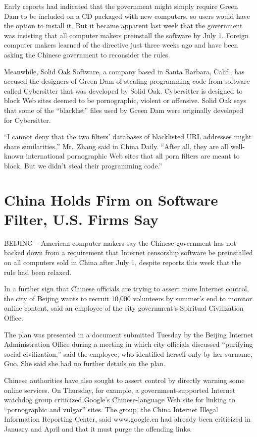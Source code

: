 ﻿\documentclass[12pt,a4paper,onecolumn]{article}
\begin{document}
Early reports had indicated that the government might simply require Green Dam to be included on a
CD packaged with new computers, so users would have the option to install it. But it became apparent
last week that the government was insisting that all computer makers preinstall the software by July
1. Foreign computer makers learned of the directive just three weeks ago and have been asking the
Chinese government to reconsider the rules.

Meanwhile, Solid Oak Software, a company based in Santa Barbara, Calif., has accused the designers
of Green Dam of stealing programming code from software called Cybersitter that was developed by
Solid Oak. Cybersitter is designed to block Web sites deemed to be pornographic, violent or
offensive. Solid Oak says that some of the ``blacklist'' files used by Green Dam were originally
developed for Cybersitter.

``I cannot deny that the two filters' databases of blacklisted URL addresses might share
similarities,'' Mr.~Zhang said in China Daily. ``After all, they are all well-known international
pornographic Web sites that all porn filters are meant to block. But we didn't steal their
programming code.''






\section{China Holds Firm on Software Filter, U.S. Firms Say}

BEIJING -- American computer makers say the Chinese government has not backed down from a
requirement that Internet censorship software be preinstalled on all computers sold in China after
July 1, despite reports this week that the rule had been relaxed.

In a further sign that Chinese officials are trying to assert more Internet control, the city of
Beijing wants to recruit 10,000 volunteers by summer's end to monitor online content, said an
employee of the city government's Spiritual Civilization Office.

The plan was presented in a document submitted Tuesday by the Beijing Internet Administration Office
during a meeting in which city officials discussed ``purifying social civilization,'' said the
employee, who identified herself only by her surname, Guo. She said she had no further details on
the plan.

Chinese authorities have also sought to assert control by directly warning some online services. On
Thursday, for example, a government-supported Internet watchdog group criticized Google's
Chinese-language Web site for linking to ``pornographic and vulgar'' sites. The group, the China
Internet Illegal Information Reporting Center, said www.google.cn had already been criticized in
January and April and that it must purge the offending links.
\end{document}
